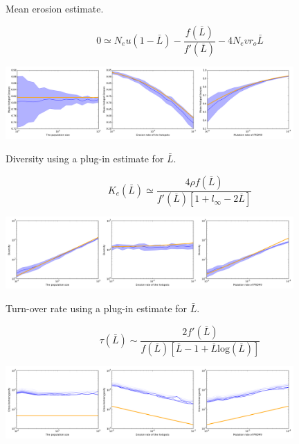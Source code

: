 \documentclass[10pt]{beamer}
\begin{document}
\begin{frame}
	\begin{center}
		\Large
    Mean erosion estimate.
	\end{center}
\[
  0 \simeq N_e u (1 - \bar{L}) - \dfrac{f(\overline{L})}{f'(\overline{L})} -
  4 N_e v r_o \bar{L}
\]
	\begin{center}
       \includegraphics[width=11cm]{Images/estimated-mean-erosion.png}
	\end{center}
\end{frame}

\begin{frame}
	\begin{center}
		\Large
    Diversity using a plug-in estimate for $\bar{L}$.
	\end{center}
\[
  K_e(\bar{L}) \simeq 
  \dfrac{4 \rho f(\overline{L})}{f'(\overline{L})\left[ 1 + l_{\infty} - 2 \overline{L}  \right]}
\]
	\begin{center}
       \includegraphics[width=11cm]{Images/estimated-diversity.png}
	\end{center}
\end{frame}

\begin{frame}
	\begin{center}
		\Large
    Turn-over rate using a plug-in estimate for $\bar{L}$.
	\end{center}
\[
  \tau (\bar{L}) \sim \dfrac{2 f'(\overline{L})}{f(\overline{L})[\overline{L}-1 + \overline{L} \mathrm{log}(\overline{L})]}
\]
	\begin{center}
       \includegraphics[width=11cm]{Images/estimated-turn-over.png}
	\end{center}
\end{frame}
\end{document}

